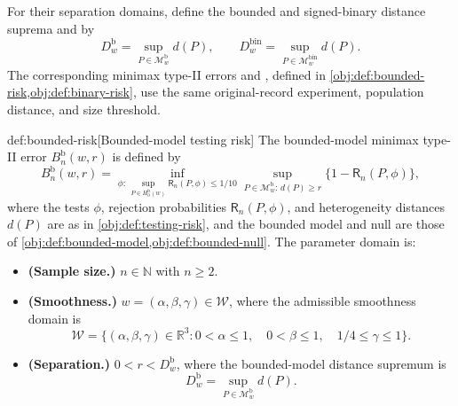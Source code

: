 \documentclass[11pt]{article}
\begin{document}
For their separation domains, define the bounded and signed-binary distance suprema  and  by
\[
D_w^{\mathrm b}
=
\sup_{P\in\mathcal M^{\mathrm b}_w}d(P),
\qquad
D_w^{\mathrm{bin}}
=
\sup_{P\in\mathcal M^{\mathrm{bin}}_w}d(P).
\]
The corresponding minimax type-II errors  and , defined in \cref{obj:def:bounded-risk,obj:def:binary-risk}, use the same original-record experiment, population distance, and size threshold.

\begin{definitionv}{def:bounded-risk}[Bounded-model testing risk]
The bounded-model minimax type-II error \(B_n^{\mathrm b}(w,r)\) is defined by
\[
B_n^{\mathrm b}(w,r)
=
\inf_{\phi:\,\sup_{P\in H_0^{\mathrm b}(w)}\mathsf R_n(P,\phi)\le 1/10}
\sup_{P\in\mathcal M^{\mathrm b}_w:\,d(P)\ge r}
\{1-\mathsf R_n(P,\phi)\},
\]
where the tests \(\phi\), rejection probabilities \(\mathsf R_n(P,\phi)\), and heterogeneity distances \(d(P)\) are as in \cref{obj:def:testing-risk}, and the bounded model and null are those of \cref{obj:def:bounded-model,obj:def:bounded-null}. The parameter domain is:
\begin{itemize}
\item \textbf{(Sample size.)} \(n\in\mathbb N\) with \(n\ge2\).
\item \textbf{(Smoothness.)} \(w=(\alpha,\beta,\gamma)\in\mathcal W\), where the admissible smoothness domain is
\[
\mathcal W
=
\{(\alpha,\beta,\gamma)\in\mathbb R^3:
0<\alpha\le1,\quad 0<\beta\le1,\quad 1/4\le\gamma\le1\}.
\]
\item \textbf{(Separation.)} \(0<r<D_w^{\mathrm b}\), where the bounded-model distance supremum is
\[
D_w^{\mathrm b}
=
\sup_{P\in\mathcal M^{\mathrm b}_w}d(P).
\]
\end{itemize}
\end{definitionv}
\end{document}
